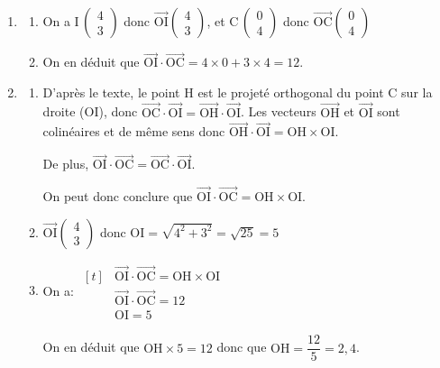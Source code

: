 \documentclass[10pt]{article}
\providecommand{\vectt}[1]{\overrightarrow{\mathrm{#1}}}
\providecommand{\ds}{\displaystyle}
\begin{document}
\begin{enumerate}
\item 
	\begin{enumerate}
		\item 
On a I\,$\begin{pmatrix} 4\\3 \end{pmatrix}$ donc
$\vectt{OI} \begin{pmatrix} 4\\3 \end{pmatrix}$,
et
C\,$\begin{pmatrix} 0\\4 \end{pmatrix}$ donc
$\vectt{OC} \begin{pmatrix} 0\\4 \end{pmatrix}$

		\item 
On en déduit que
$\vectt{OI}\cdot \vectt{OC}=4\times 0 + 3\times 4 = 12$.		
	\end{enumerate}
	
\item 
	\begin{enumerate}
		\item 
D'après le texte, le point H est le projeté orthogonal du point C sur la droite (OI), donc
$\vectt{OC}\cdot \vectt{OI} = \vectt{OH}\cdot \vectt{OI}$.
Les vecteurs $ \vectt{OH}$ et $\vectt{OI}$ sont colinéaires et de même sens donc $\vectt{OH}\cdot \vectt{OI}= \text{OH}\times \text{OI}$.

De plus, $\vectt{OI}\cdot \vectt{OC} = \vectt{OC}\cdot \vectt{OI}$.

On peut donc conclure que $\vectt{OI}\cdot \vectt{OC} = \text{OH}\times \text{OI}$.

		\item 
$\vectt{OI} \begin{pmatrix} 4\\3 \end{pmatrix}$ donc $\text{OI} = \ds\sqrt{4^2+3^2} = \sqrt{25} = 5$

		\item 
On a: $\begin{aligned}[t]
 & \vectt{OI}\cdot \vectt{OC} = \text{OH}\times \text{OI}\\
& \vectt{OI}\cdot \vectt{OC} = 12\\
& \text{OI}=5
\end{aligned}$

On en déduit que $\text{OH}\times 5=12$ donc que $\text{OH} = \dfrac{12}{5}=2,4$.


\end{enumerate}
\end{enumerate}
\end{document}
